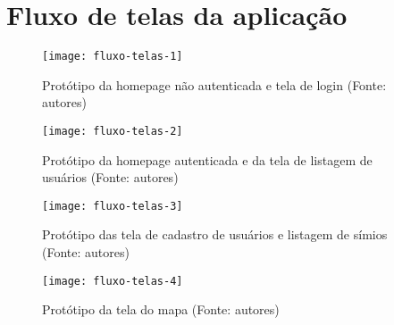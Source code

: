 \chapter{Fluxo de telas da aplicação}

\begin{figure}[ht]
  \centering
    \texttt{[image: fluxo-telas-1]}
  \caption{Protótipo da homepage não autenticada e tela de login (Fonte: autores)}
\end{figure}

\begin{figure}[ht]
  \centering
    \texttt{[image: fluxo-telas-2]}
  \caption{Protótipo da homepage autenticada e da tela de listagem de usuários (Fonte: autores)}
\end{figure}

\begin{figure}[ht]
  \centering
    \texttt{[image: fluxo-telas-3]}
  \caption{Protótipo das tela de cadastro de usuários e listagem de símios (Fonte: autores)}
\end{figure}

\begin{figure}[ht]
  \centering
    \texttt{[image: fluxo-telas-4]}
  \caption{Protótipo da tela do mapa (Fonte: autores)}
\end{figure}